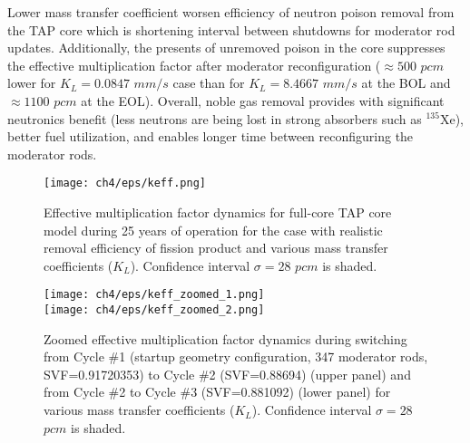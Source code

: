 Lower mass transfer coefficient worsen efficiency of neutron poison removal 
from the \gls{TAP} core which is shortening interval between shutdowns for 
moderator rod updates. Additionally, the presents of unremoved poison in the 
core suppresses the effective multiplication factor after moderator 
reconfiguration ($\approx500$ $pcm$ lower for $K_L=0.0847$ $mm/s$ case than 
for $K_L=8.4667$ $mm/s$ at the \gls{BOL} and $\approx1100$ $pcm$ at the 
\gls{EOL}). Overall, noble gas removal provides with significant neutronics 
benefit (less neutrons are being lost in strong absorbers such as $^{135}$Xe), 
better fuel utilization, and enables longer time between reconfiguring the 
moderator rods.
\begin{figure}[htp!] %
	\centering
	\texttt{[image: ch4/eps/keff.png]}
	\caption{Effective multiplication factor dynamics for full-core \gls{TAP} 
		core model during 25 years of operation for the case with realistic 
		removal efficiency of fission product and various mass transfer 
		coefficients ($K_L$). Confidence interval $\sigma=28$ $pcm$ is shaded.}
	\label{fig:keff-eps-var}
\end{figure}

\begin{figure}[htbp!] %
	\centering
	\texttt{[image: ch4/eps/keff\_zoomed\_1.png]}\\
	\vspace{-8mm}
		\hspace{+1mm}
	\texttt{[image: ch4/eps/keff\_zoomed\_2.png]}
	\vspace{-3mm}
	\caption{Zoomed effective multiplication factor dynamics during switching
	from Cycle \#1 (startup geometry configuration, 347 moderator rods, 
	\gls{SVF}=0.91720353) to Cycle \#2 (\gls{SVF}=0.88694) (upper panel) and
	from Cycle \#2 to  Cycle \#3 (\gls{SVF}=0.881092) 
	(lower panel) for various mass transfer coefficients ($K_L$). 
	Confidence interval $\sigma=28$ $pcm$ is shaded.}
	\label{fig:keff-eps-var-zoom}
\end{figure}

